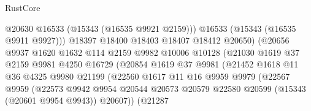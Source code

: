 \begin{lexlean}{RustCore}
\begin{coremodule}
                                      @20630
                                      @16533
                                      (@15343 (@16535 @9921 @2159)))
                                    @16533
                                    (@15343 (@16535 @9911 @9927)))
                                  @18397
                                  @18400
                                  @18403
                                  @18407
                                  @18412
                                  @20650)
                                (@20656
                                  @9937
                                  @1620
                                  @1632
                                  @114
                                  @2159
                                  @9982
                                  @10006
                                  @10128
                                  (@21030
                                    @1619
                                    @37
                                    @2159
                                    @9981
                                    @4250
                                    @16729
                                    (@20854
                                      @1619
                                      @37
                                      @9981
                                      (@21452
                                        @1618
                                        @11
                                        @36
                                        @4325
                                        @9980
                                        @21199
                                        (@22560
                                          @1617
                                          @11
                                          @16
                                          @9959
                                          @9979
                                          (@22567
                                            @9959
                                            (@22573
                                              @9942
                                              @9954
                                              @20544
                                              @20573
                                              @20579
                                              @22580
                                              @20599
                                              (@15343 (@20601 @9954 @9943))
                                              @20607))
                                          (@21287

\end{coremodule}
\end{lexlean}
